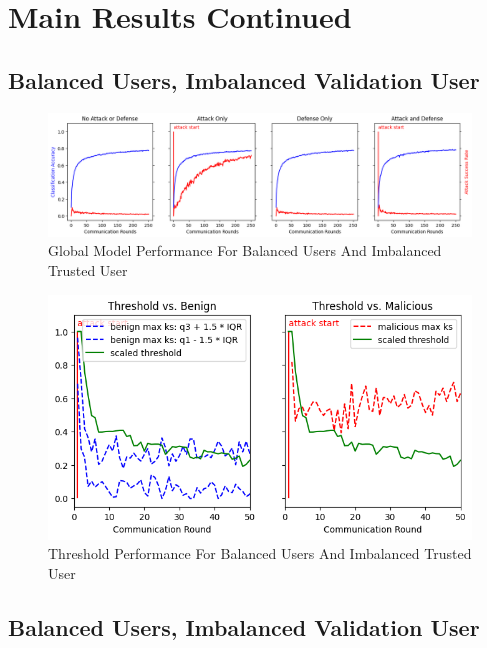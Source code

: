 \documentclass{article} %
\begin{document}
%
\section{Main Results Continued}

%
\subsection{Balanced Users, Imbalanced Validation User}
\label{sec.imbal_val}

\begin{figure}[H]
    \centering
    \includegraphics[width=\textwidth]{01_trusted/centralized/alpha10000--alpha_val1/visuals/accuracy--n_malicious1--m_start1.png}
    \caption{Global Model Performance For Balanced Users And Imbalanced Trusted User}
    \label{fig:centralized--alpha10000--alpha_val1--accuracy--n_malicious1--m_start1}
\end{figure}

\begin{figure}[H]
    \centering
    \includegraphics[width=.75\textwidth]{01_trusted/centralized/alpha10000--alpha_val1/visuals/threshold--n_malicious1--m_start1--d_rounds50.png}
    \caption{Threshold Performance For Balanced Users And Imbalanced Trusted User}
    \label{fig:centralized--alpha10000--alpha_val1--threshold--n_malicious1--m_start1--d_rounds50}
\end{figure}

%
\subsection{Balanced Users, Imbalanced Validation User}
\label{sec.imbal_users}
\end{document}
